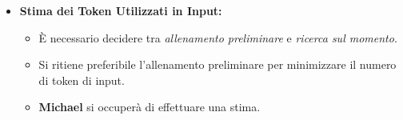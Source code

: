 \begin{itemize}
    \item \textbf{Stima dei Token Utilizzati in Input:}
    \begin{itemize}
        \renewcommand{\labelitemii}{--}
        \item È necessario decidere tra \emph{allenamento preliminare} e \emph{ricerca sul momento}.
        \item Si ritiene preferibile l'allenamento preliminare per minimizzare il numero di token di input.
        \item \textbf{Michael} si occuperà di effettuare una stima.
    \end{itemize}
\end{itemize}